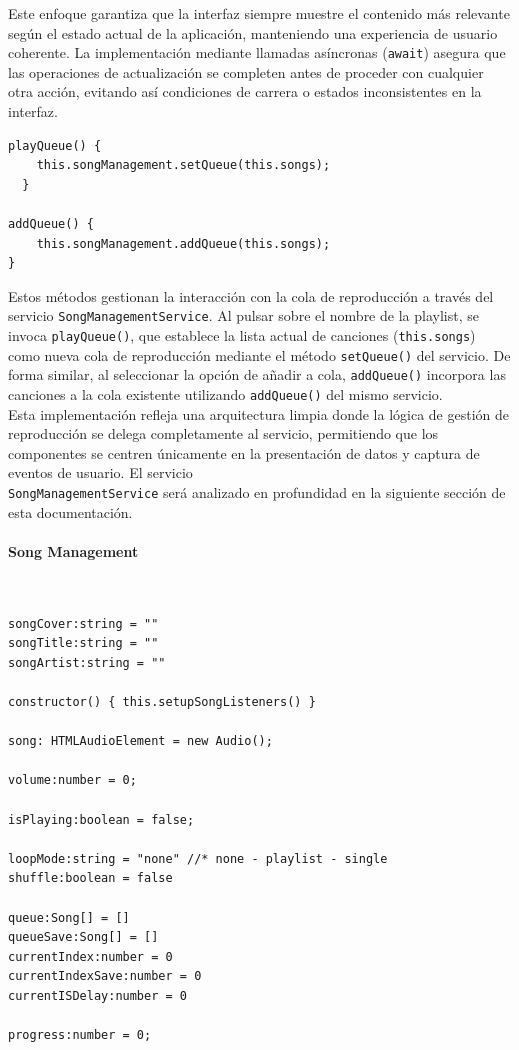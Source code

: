 \documentclass[11pt, a4paper]{article}
\begin{document}
                Este enfoque garantiza que la interfaz siempre muestre el contenido más relevante según el estado actual de la aplicación, manteniendo una experiencia de usuario coherente. La implementación mediante llamadas asíncronas (\verb|await|) asegura que las operaciones de actualización se completen antes de proceder con cualquier otra acción, evitando así condiciones de carrera o estados inconsistentes en la interfaz.

                \begin{lstlisting}[caption={playQueue() y addQueue()}]
playQueue() {
    this.songManagement.setQueue(this.songs);
  }

addQueue() {
    this.songManagement.addQueue(this.songs);
}
                \end{lstlisting}

                Estos métodos gestionan la interacción con la cola de reproducción a través del servicio \verb|SongManagementService|. Al pulsar sobre el nombre de la playlist, se invoca \verb|playQueue()|, que establece la lista actual de canciones (\verb|this.songs|) como nueva cola de reproducción mediante el método \verb|setQueue()| del servicio. De forma similar, al seleccionar la opción de añadir a cola, \verb|addQueue()| incorpora las canciones a la cola existente utilizando \verb|addQueue()| del mismo servicio. \\

                Esta implementación refleja una arquitectura limpia donde la lógica de gestión de reproducción se delega completamente al servicio, permitiendo que los componentes se centren únicamente en la presentación de datos y captura de eventos de usuario. El servicio \\ \verb|SongManagementService| será analizado en profundidad en la siguiente sección de esta documentación.

                \paragraph{Song Management}
                ‎

                \begin{lstlisting}[caption={Atributos Song Management}]
songCover:string = ""
songTitle:string = ""
songArtist:string = ""

constructor() { this.setupSongListeners() }

song: HTMLAudioElement = new Audio();

volume:number = 0;

isPlaying:boolean = false;

loopMode:string = "none" //* none - playlist - single
shuffle:boolean = false

queue:Song[] = []
queueSave:Song[] = []
currentIndex:number = 0
currentIndexSave:number = 0
currentISDelay:number = 0

progress:number = 0;
                \end{lstlisting}
\end{document}
